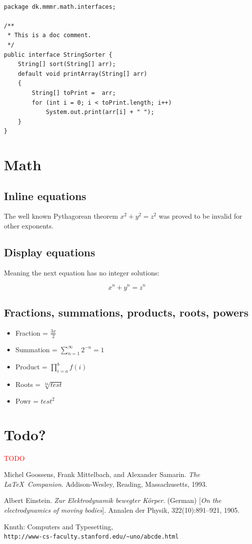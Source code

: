 \documentclass{book}
\newcommand\todo[1]{\textcolor{red}{#1}}
\begin{document}
\begin{lstlisting}

package dk.mmmr.math.interfaces;

/**
 * This is a doc comment.
 */
public interface StringSorter {
    String[] sort(String[] arr);
    default void printArray(String[] arr)
    {
        String[] toPrint =  arr;
        for (int i = 0; i < toPrint.length; i++)
            System.out.print(arr[i] + " ");
    }
}
\end{lstlisting}

\chapter{Math}
\section{Inline equations}
The well known Pythagorean theorem \(x^2 + y^2 = z^2\) was 
proved to be invalid for other exponents. 
\section{Display equations}
Meaning the next equation has no integer solutions:

\[ x^n + y^n = z^n \]
\section{Fractions, summations, products, roots, powers}
\begin{itemize}
  \item Fraction = \(\frac{3x}{2}\) 
  \item Summation = $\sum_{n=1}^{\infty} 2^{-n} = 1$
  \item Product = $\prod_{i=a}^{b} f(i)$
  \item Roots = \(\sqrt[34]{test}\)
  \item Powr = \(test^2\)
\end{itemize}


\chapter{Todo?}
\todo{TODO}

\begin{thebibliography}{9}
Michel Goossens, Frank Mittelbach, and Alexander Samarin. 
\textit{The \LaTeX\ Companion}. 
Addison-Wesley, Reading, Massachusetts, 1993.

Albert Einstein. 
\textit{Zur Elektrodynamik bewegter K{\"o}rper}. (German) 
[\textit{On the electrodynamics of moving bodies}]. 
Annalen der Physik, 322(10):891–921, 1905.

Knuth: Computers and Typesetting,
\\\texttt{http://www-cs-faculty.stanford.edu/\~{}uno/abcde.html}
\end{thebibliography}
\end{document}
